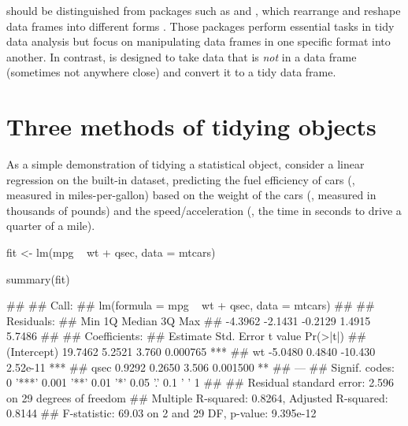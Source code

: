  should be distinguished from packages such as  and , which rearrange and reshape data frames into different forms \citep{package:reshape2,package:tidyr}. Those packages perform essential tasks in tidy data analysis but focus on manipulating data frames in one specific format into another. In contrast,  is designed to take data that is \emph{not} in a data frame (sometimes not anywhere close) and convert it to a tidy data frame.

\section{Three methods of tidying objects}

As a simple demonstration of tidying a statistical object, consider a linear regression on the built-in  dataset, predicting the fuel efficiency of cars (, measured in miles-per-gallon) based on the weight of the cars (, measured in thousands of pounds) and the speed/acceleration (, the time in seconds to drive a quarter of a mile).


\begin{example}
fit <- lm(mpg ~ wt + qsec, data = mtcars)
\end{example}

\begin{example}
summary(fit)
\end{example}

\begin{example}
## 
## Call:
## lm(formula = mpg ~ wt + qsec, data = mtcars)
## 
## Residuals:
##     Min      1Q  Median      3Q     Max 
## -4.3962 -2.1431 -0.2129  1.4915  5.7486 
## 
## Coefficients:
##             Estimate Std. Error t value Pr(>|t|)    
## (Intercept)  19.7462     5.2521   3.760 0.000765 ***
## wt           -5.0480     0.4840 -10.430 2.52e-11 ***
## qsec          0.9292     0.2650   3.506 0.001500 ** 
## ---
## Signif. codes:  0 '***' 0.001 '**' 0.01 '*' 0.05 '.' 0.1 ' ' 1
## 
## Residual standard error: 2.596 on 29 degrees of freedom
## Multiple R-squared:  0.8264,	Adjusted R-squared:  0.8144 
## F-statistic: 69.03 on 2 and 29 DF,  p-value: 9.395e-12

\end{example}


